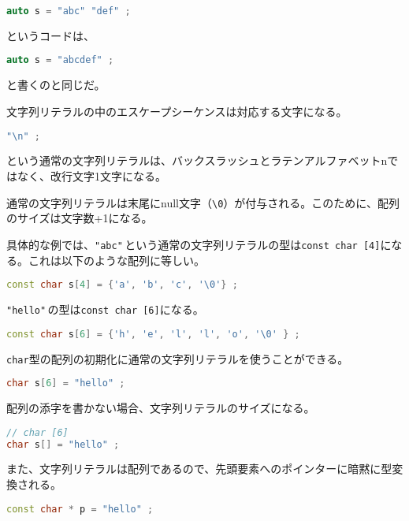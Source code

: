 \begin{lstlisting}[language={C++}]
auto s = "abc" "def" ;
\end{lstlisting}
というコードは、
\begin{lstlisting}[language={C++}]
auto s = "abcdef" ;
\end{lstlisting}
と書くのと同じだ。

文字列リテラルの中のエスケープシーケンスは対応する文字になる。

\begin{lstlisting}[language={C++}]
"\n" ;
\end{lstlisting}
という通常の文字列リテラルは、バックスラッシュとラテンアルファベットnではなく、改行文字1文字になる。

通常の文字列リテラルは末尾にnull文字（\texttt{{\textbackslash}0}）が付与される。このために、配列のサイズは文字数+1になる。

具体的な例では、\texttt{"abc"}\,という通常の文字列リテラルの型は\texttt{const char [4]}になる。これは以下のような配列に等しい。

\begin{lstlisting}[language={C++}]
const char s[4] = {'a', 'b', 'c', '\0'} ;
\end{lstlisting}

\texttt{"hello"}\,の型は\texttt{const char [6]}になる。

\begin{lstlisting}[language={C++}]
const char s[6] = {'h', 'e', 'l', 'l', 'o', '\0' } ;
\end{lstlisting}

\texttt{char}型の配列の初期化に通常の文字列リテラルを使うことができる。

\begin{lstlisting}[language={C++}]
char s[6] = "hello" ;
\end{lstlisting}

配列の添字を書かない場合、文字列リテラルのサイズになる。

\begin{lstlisting}[language={C++}]
// char [6]
char s[] = "hello" ;
\end{lstlisting}

また、文字列リテラルは配列であるので、先頭要素へのポインターに暗黙に型変換される。

\begin{lstlisting}[language={C++}]
const char * p = "hello" ;
\end{lstlisting}

